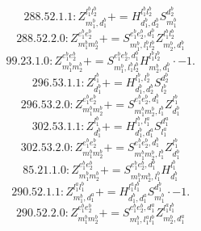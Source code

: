 \documentclass[letterpaper,10pt,fleqn,leqno,onecolumn]{article}
\begin{document}
\begin{equation} \;\;\;\;\;\;  288.52.1.1: Z^{l_{1}^{b}l_{2}^{b}}_{m_{1}^{b},d_{1}^{b}}+=H^{l_{1}^{b}l_{2}^{b}}_{d_{1}^{b},d_{2}^{b}}S^{d_{2}^{b}}_{m_{1}^{b}} \end{equation}
\begin{equation} \;\;\;\;\;\;  288.52.2.0: Z^{e_{1}^{b}e_{2}^{b}}_{m_{1}^{b}m_{2}^{b}}+=S^{e_{1}^{b}e_{2}^{b},d_{1}^{b}}_{m_{1}^{b},l_{1}^{b}l_{2}^{b}}Z^{l_{1}^{b}l_{2}^{b}}_{m_{2}^{b},d_{1}^{b}} \end{equation}
\begin{equation} \;\;\;\;\;\;  99.23.1.0: Z^{e_{1}^{b}e_{2}^{b}}_{m_{1}^{b}m_{2}^{b}}+=S^{e_{1}^{b}e_{2}^{b},d_{1}^{b}}_{m_{1}^{b},l_{1}^{b}l_{2}^{b}}H^{l_{1}^{b}l_{2}^{b}}_{m_{2}^{b},d_{1}^{b}}\cdot -1. \end{equation}
\begin{equation} \;\;\;\;\;\;  296.53.1.1: Z^{l_{1}^{b}}_{d_{1}^{b}}+=H^{l_{1}^{b},l_{2}^{b}}_{d_{1}^{b},d_{2}^{b}}S^{d_{2}^{b}}_{l_{2}^{b}} \end{equation}
\begin{equation} \;\;\;\;\;\;  296.53.2.0: Z^{e_{1}^{b}e_{2}^{b}}_{m_{1}^{b}m_{2}^{b}}+=S^{e_{1}^{b}e_{2}^{b},d_{1}^{b}}_{m_{1}^{b}m_{2}^{b},l_{1}^{b}}Z^{l_{1}^{b}}_{d_{1}^{b}} \end{equation}
\begin{equation} \;\;\;\;\;\;  302.53.1.1: Z^{l_{1}^{b}}_{d_{1}^{b}}+=H^{l_{1}^{b},l_{1}^{a}}_{d_{1}^{b},d_{1}^{a}}S^{d_{1}^{a}}_{l_{1}^{a}} \end{equation}
\begin{equation} \;\;\;\;\;\;  302.53.2.0: Z^{e_{1}^{b}e_{2}^{b}}_{m_{1}^{b}m_{2}^{b}}+=S^{e_{1}^{b}e_{2}^{b},d_{1}^{b}}_{m_{1}^{b}m_{2}^{b},l_{1}^{b}}Z^{l_{1}^{b}}_{d_{1}^{b}} \end{equation}
\begin{equation} \;\;\;\;\;\;  85.21.1.0: Z^{e_{1}^{b}e_{2}^{b}}_{m_{1}^{b}m_{2}^{b}}+=S^{e_{1}^{b}e_{2}^{b},d_{1}^{b}}_{m_{1}^{b}m_{2}^{b},l_{1}^{b}}H^{l_{1}^{b}}_{d_{1}^{b}} \end{equation}
\begin{equation} \;\;\;\;\;\;  290.52.1.1: Z^{l_{1}^{a}l_{1}^{b}}_{m_{1}^{b},d_{1}^{a}}+=H^{l_{1}^{a}l_{1}^{b}}_{d_{1}^{b},d_{1}^{a}}S^{d_{1}^{b}}_{m_{1}^{b}}\cdot -1. \end{equation}
\begin{equation} \;\;\;\;\;\;  290.52.2.0: Z^{e_{1}^{b}e_{2}^{b}}_{m_{1}^{b}m_{2}^{b}}+=S^{e_{1}^{b}e_{2}^{b},d_{1}^{a}}_{m_{1}^{b},l_{1}^{a}l_{1}^{b}}Z^{l_{1}^{a}l_{1}^{b}}_{m_{2}^{b},d_{1}^{a}} \end{equation}
\end{document}
